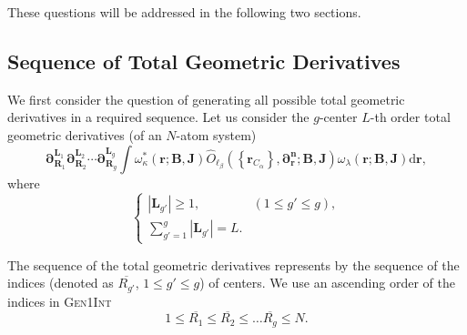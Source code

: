 \documentclass[a4paper,11pt,twoside,openright]{book}
\begin{document}
These questions will be addressed in the following two sections.

\subsection{Sequence of Total Geometric Derivatives}
\label{subsec:geom-total}

We first consider the question of generating all possible total geometric derivatives in a required
sequence. Let us consider the $g$-center $L$-th order total geometric derivatives (of an $N$-atom system)
\begin{equation}
  \label{eq:total-geom-derivatives}
  \boldsymbol{\partial}_{\boldsymbol{R}_{1}}^{\boldsymbol{L}_{1}}%
  \boldsymbol{\partial}_{\boldsymbol{R}_{2}}^{\boldsymbol{L}_{2}}\cdots%
  \boldsymbol{\partial}_{\boldsymbol{R}_{g}}^{\boldsymbol{L}_{g}}%
  \int\omega_{\kappa}^\ast(\boldsymbol{r};\boldsymbol{B},\boldsymbol{J})
  \hat{O}_{\ell_{\beta}}\left(\left\{\boldsymbol{r}_{C_{\alpha}}\right\},%
    \boldsymbol{\partial_{r}^{n}};\boldsymbol{B},\boldsymbol{J}\right)%
  \omega_{\lambda}(\boldsymbol{r};\boldsymbol{B},\boldsymbol{J})\mathrm{d}\boldsymbol{r},
\end{equation}
where
\begin{equation}
  \begin{cases}
    |\boldsymbol{L}_{g'}|\ge1,&(1\le g'\le g),\\
    \sum_{g'=1}^{g}|\boldsymbol{L}_{g'}|=L.
  \end{cases}
\end{equation}

The sequence of the total geometric derivatives represents by the sequence of the indices
(denoted as $\overline{R_{g'}}$, $1\le g'\le g$) of centers. We use an ascending order of the
indices in \textsc{Gen1Int}
\begin{equation}
  \label{eq:ascending-centers}
  1\le\overline{R_{1}}\le\overline{R_{2}}\le\dots\overline{R_{g}}\le N.
\end{equation}
\end{document}

